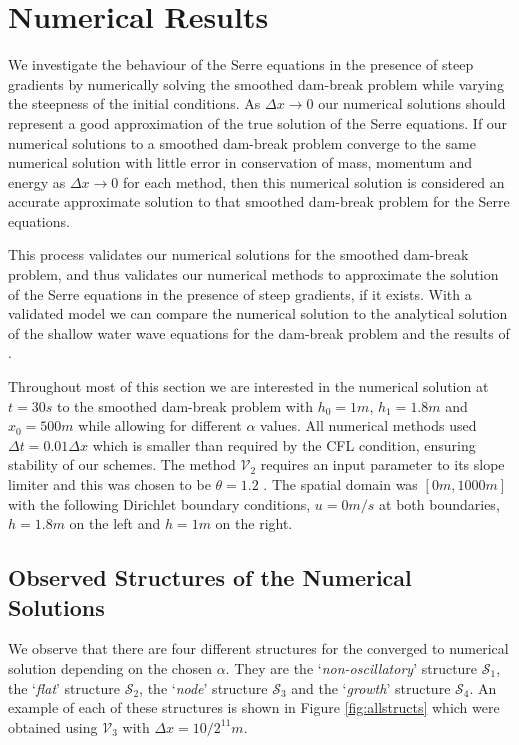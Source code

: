 \documentclass[times]{elsarticle}
\begin{document}
\section{Numerical Results}
\label{section:NumRes}
We investigate the behaviour of the Serre equations in the presence of steep gradients by numerically solving the smoothed dam-break problem while varying the steepness of the initial conditions. As $\Delta x \rightarrow 0$ our numerical solutions should represent a good approximation of the true solution of the Serre equations. If our numerical solutions to a smoothed dam-break problem converge to the same numerical solution with little error in conservation of mass, momentum and energy as $\Delta x \rightarrow 0$ for each method, then this numerical solution is considered an accurate approximate solution to that smoothed dam-break problem for the Serre equations.

This process validates our numerical solutions for the smoothed dam-break problem, and thus validates our numerical methods to approximate the solution of the Serre equations in the presence of steep gradients, if it exists. With a validated model we can compare the numerical solution to the analytical solution of the shallow water wave equations for the dam-break problem and the results of \citet{El-etal-2006}.

Throughout most of this section we are interested in the numerical solution at $t=30s$ to the smoothed dam-break problem with $h_0 = 1m$, $h_1 = 1.8m$ and $x_0 = 500m$ while allowing for different $\alpha$ values. All numerical methods used $\Delta t = 0.01 \Delta x$ which is smaller than required by the CFL condition, ensuring stability of our schemes. The method $\mathcal{V}_2$ requires an input parameter to its slope limiter and this was chosen to be $\theta = 1.2$ \cite{Zoppou-etal-2017}. The spatial domain was $[0m,1000m]$ with the following Dirichlet boundary conditions, $u = 0m/s$ at both boundaries, $h =1.8m$ on the left and $h =1m$ on the right.

\subsection{Observed Structures of the Numerical Solutions}
\label{subsec:observedstructs}
We observe that there are four different structures for the converged to numerical solution depending on the chosen $\alpha$. They are the `\textit{non-oscillatory}' structure $\mathcal{S}_1$, the `\textit{flat}' structure $\mathcal{S}_2$, the `\textit{node}' structure $\mathcal{S}_3$ and the `\textit{growth}' structure $\mathcal{S}_4$. An example of each of these structures is shown in Figure \ref{fig:allstructs} which were obtained using $\mathcal{V}_3$ with $\Delta x = 10/2^{11}m$.
\end{document}
